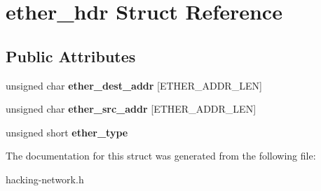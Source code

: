 \hypertarget{structether__hdr}{}\section{ether\+\_\+hdr Struct Reference}
\label{structether__hdr}
\subsection*{Public Attributes}
\begin{DoxyCompactItemize}
\item 
unsigned char {\bfseries ether\+\_\+dest\+\_\+addr} \mbox{[}E\+T\+H\+E\+R\+\_\+\+A\+D\+D\+R\+\_\+\+L\+EN\mbox{]}\hypertarget{structether__hdr_a75ac8d938e5b4c8ace0c7989df8ccf96}{}\label{structether__hdr_a75ac8d938e5b4c8ace0c7989df8ccf96}

\item 
unsigned char {\bfseries ether\+\_\+src\+\_\+addr} \mbox{[}E\+T\+H\+E\+R\+\_\+\+A\+D\+D\+R\+\_\+\+L\+EN\mbox{]}\hypertarget{structether__hdr_a28e500aa274f4e0e238daf1111d37864}{}\label{structether__hdr_a28e500aa274f4e0e238daf1111d37864}

\item 
unsigned short {\bfseries ether\+\_\+type}\hypertarget{structether__hdr_aa06fcc3a21680faa65b24c6e6f97832b}{}\label{structether__hdr_aa06fcc3a21680faa65b24c6e6f97832b}

\end{DoxyCompactItemize}


The documentation for this struct was generated from the following file\+:\begin{DoxyCompactItemize}
\item 
hacking-\/network.\+h\end{DoxyCompactItemize}
